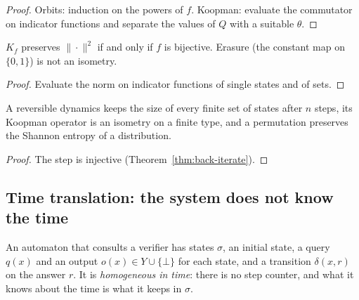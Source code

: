 \begin{proof}
  \leanok
  Orbits: induction on the powers of $f$. Koopman: evaluate the commutator on indicator functions and
  separate the values of $Q$ with a suitable $\theta$.
\end{proof}

\begin{theorem}
  \label{thm:koopman-isometry}
  \leanok
  $K_f$ preserves $\|\cdot\|^2$ if and only if $f$ is bijective. Erasure (the constant map on
  $\{0,1\}$) is not an isometry.
  \own{}
\end{theorem}

\begin{proof}
  \leanok
  Evaluate the norm on indicator functions of single states and of sets.
\end{proof}

\begin{theorem}
  \label{thm:card-image}
  \leanok
  A reversible dynamics keeps the size of every finite set of states after $n$ steps, its Koopman
  operator is an isometry on a finite type, and a permutation preserves the Shannon entropy of a
  distribution.
  \own{}
\end{theorem}

\begin{proof}
  \leanok
  The step is injective (Theorem~\ref{thm:back-iterate}).
\end{proof}

\subsection{Time translation: the system does not know the time}

\begin{definition}
  \label{def:automaton}
  \leanok
  An automaton that consults a verifier has states $\sigma$, an initial state, a query $q(x)$ and an
  output $o(x) \in Y \cup \{\bot\}$ for each state, and a transition $\delta(x, r)$ on the answer
  $r$. It is \emph{homogeneous in time}: there is no step counter, and what it knows about the time
  is what it keeps in $\sigma$.
  \own{}
\end{definition}

